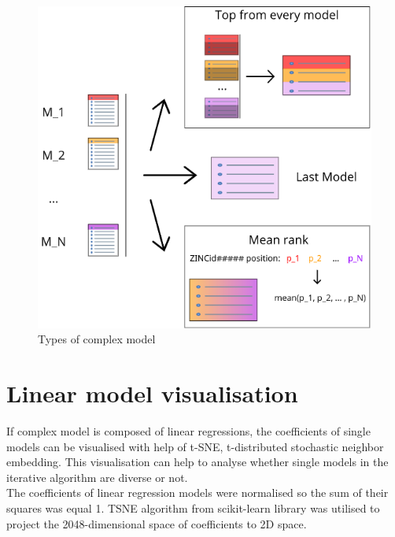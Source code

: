 \begin{figure}[H]
    \centering
    \includegraphics[scale=0.7]{Images/image2.png}
    \caption{Types of complex model}
    \label{ComplexModels}
\end{figure}

\section{Linear model visualisation}
If complex model is composed of linear regressions, the coefficients of single models can be visualised with help of t-SNE, t-distributed stochastic neighbor embedding.
This visualisation can help to analyse whether single models in the iterative algorithm are diverse or not. \\

The coefficients of linear regression models were normalised so the sum of their squares was equal 1.
TSNE algorithm from scikit-learn library was utilised to project the 2048-dimensional space of coefficients to 2D space. 

